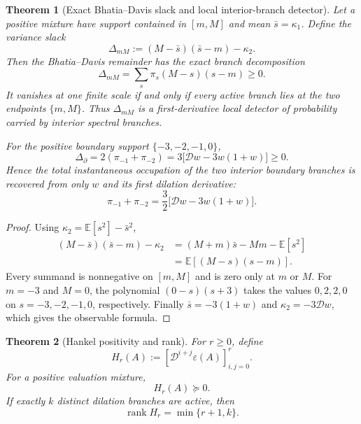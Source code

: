 \documentclass[aps,prd,reprint,onecolumn,nofootinbib,superscriptaddress,showkeys]{revtex4-2}
\numberwithin{equation}{section}
\theoremstyle{definition}
\theoremstyle{plain}
\newtheorem{theorem}{Theorem}[section]
\newcommand{\Dil}{\mathscr D}
\begin{document}
\begin{theorem}[Exact Bhatia--Davis slack and local interior-branch detector]\label{thm:bd-slack}
Let a positive mixture have support contained in $[m,M]$ and mean $\bar s=\kappa_1$.  Define the variance slack
\begin{equation}
\Delta_{mM}
:=(M-\bar s)(\bar s-m)-\kappa_2.
\end{equation}
Then the Bhatia--Davis remainder has the exact branch decomposition
\begin{equation}
\boxed{
\Delta_{mM}
=\sum_s\pi_s(M-s)(s-m)\ge0.
}
\end{equation}
It vanishes at one finite scale if and only if every active branch lies at the two endpoints $\{m,M\}$.  Thus $\Delta_{mM}$ is a first-derivative local detector of probability carried by interior spectral branches.

For the positive boundary support $\{-3,-2,-1,0\}$,
\begin{equation}
\boxed{
\Delta_{\partial}
=2(\pi_{-1}+\pi_{-2})
=3\bigl[\Dil w-3w(1+w)\bigr]\ge0.
}
\end{equation}
Hence the total instantaneous occupation of the two interior boundary branches is recovered from only $w$ and its first dilation derivative:
\begin{equation}
\boxed{
\pi_{-1}+\pi_{-2}
=\frac32\bigl[\Dil w-3w(1+w)\bigr].
}
\end{equation}
\end{theorem}

\begin{proof}
Using $\kappa_2=\mathbb E[s^2]-\bar s^2$,
\begin{align*}
(M-\bar s)(\bar s-m)-\kappa_2
&=(M+m)\bar s-Mm-\mathbb E[s^2]\\
&=\mathbb E\!\left[(M-s)(s-m)\right].
\end{align*}
Every summand is nonnegative on $[m,M]$ and is zero only at $m$ or $M$.  For $m=-3$ and $M=0$, the polynomial $(0-s)(s+3)$ takes the values $0,2,2,0$ on $s=-3,-2,-1,0$, respectively.  Finally $\bar s=-3(1+w)$ and $\kappa_2=-3\Dil w$, which gives the observable formula.
\end{proof}

\begin{theorem}[Hankel positivity and rank]
For \(r\ge0\), define
\[
H_r(A):=\left[\Dil^{i+j}\varepsilon(A)\right]_{i,j=0}^{r}.
\]
For a positive valuation mixture,
\begin{equation}
H_r(A)\succeq0.
\end{equation}
If exactly \(k\) distinct dilation branches are active, then
\begin{equation}
\operatorname{rank}H_r=\min\{r+1,k\}.
\end{equation}
\end{theorem}
\end{document}
